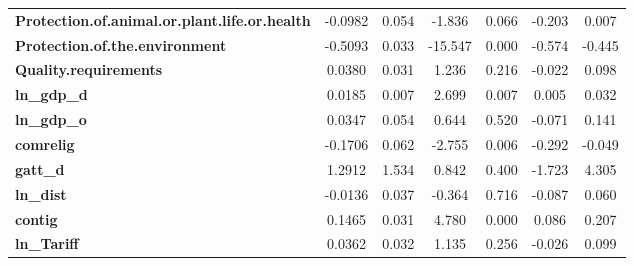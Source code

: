 \begin{center}
\begin{tabular}{lcccccc}
\textbf{Protection.of.animal.or.plant.life.or.health}              &      -0.0982  &        0.054     &    -1.836  &         0.066        &       -0.203    &        0.007     \\
\textbf{Protection.of.the.environment}                             &      -0.5093  &        0.033     &   -15.547  &         0.000        &       -0.574    &       -0.445     \\
\textbf{Quality.requirements}                                      &       0.0380  &        0.031     &     1.236  &         0.216        &       -0.022    &        0.098     \\
\textbf{ln\_gdp\_d}                                                &       0.0185  &        0.007     &     2.699  &         0.007        &        0.005    &        0.032     \\
\textbf{ln\_gdp\_o}                                                &       0.0347  &        0.054     &     0.644  &         0.520        &       -0.071    &        0.141     \\
\textbf{comrelig}                                                  &      -0.1706  &        0.062     &    -2.755  &         0.006        &       -0.292    &       -0.049     \\
\textbf{gatt\_d}                                                   &       1.2912  &        1.534     &     0.842  &         0.400        &       -1.723    &        4.305     \\
\textbf{ln\_dist}                                                  &      -0.0136  &        0.037     &    -0.364  &         0.716        &       -0.087    &        0.060     \\
\textbf{contig}                                                    &       0.1465  &        0.031     &     4.780  &         0.000        &        0.086    &        0.207     \\
\textbf{ln\_Tariff}                                                &       0.0362  &        0.032     &     1.135  &         0.256        &       -0.026    &        0.099     \\
\bottomrule
\end{tabular}
\end{center}